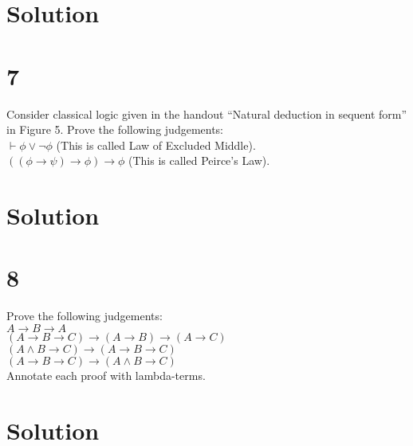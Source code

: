 \documentclass[10pt]{article}
\begin{document}
\section*{Solution}


\section*{7}

Consider classical logic given in the handout ``Natural deduction in sequent form'' in Figure 5. Prove the following judgements:\\
$\vdash \phi \lor \lnot \phi $ (This is called Law of Excluded Middle).\\
$((\phi \to \psi ) \to \phi )\to \phi $ (This is called Peirce's Law).\\

\section*{Solution}

\section*{8}

Prove the following judgements:\\
$A\to B \to A$\\
$(A\to B \to C) \to (A\to B )\to (A\to C)$\\
$(A \land B \to C )\to(A\to B \to C)$\\
$(A\to B\to C)\to (A\land B \to C)$\\
Annotate each proof with lambda-terms.

\section*{Solution}
\end{document}
